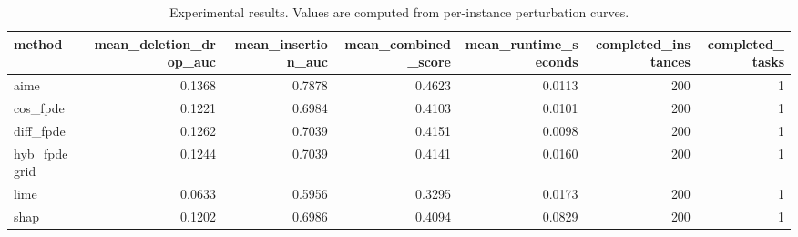 \begin{table}[t]
\caption{Experimental results. Values are computed from per-instance perturbation curves.}
\label{tab:main_results_computed}
\centering
\begin{tabular}{lrrrrrr}
\toprule
method & mean\_deletion\_drop\_auc & mean\_insertion\_auc & mean\_combined\_score & mean\_runtime\_seconds & completed\_instances & completed\_tasks \\
\midrule
aime & 0.1368 & 0.7878 & 0.4623 & 0.0113 & 200 & 1 \\
cos\_fpde & 0.1221 & 0.6984 & 0.4103 & 0.0101 & 200 & 1 \\
diff\_fpde & 0.1262 & 0.7039 & 0.4151 & 0.0098 & 200 & 1 \\
hyb\_fpde\_grid & 0.1244 & 0.7039 & 0.4141 & 0.0160 & 200 & 1 \\
lime & 0.0633 & 0.5956 & 0.3295 & 0.0173 & 200 & 1 \\
shap & 0.1202 & 0.6986 & 0.4094 & 0.0829 & 200 & 1 \\
\bottomrule
\end{tabular}

\end{table}
